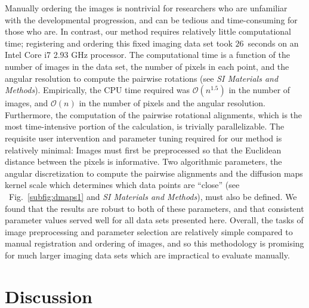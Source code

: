 \documentclass[twocolumn, 10pt]{article}
\newcommand{\SI}[0]{\textit{SI Materials and Methods}}
\newcommand{\fig}[0]{Fig.}
\begin{document}
Manually ordering the images is nontrivial for researchers who are unfamiliar with the developmental progression, and can be tedious and time-consuming for those who are.
%
In contrast, our method requires relatively little computational time; registering and ordering this fixed imaging data set took $26$~seconds on an Intel Core i7 2.93 GHz processor. %
%
The computational time is a function of the number of images in the data set, the number of pixels in each point, and the angular resolution to compute the pairwise rotations (see \SI). 
%
Empirically, the CPU time required was $\mathcal{O}(n^{1.5})$ in the number of images, and $\mathcal{O}(n)$ in the number of pixels and the angular resolution.
%
Furthermore, the computation of the pairwise rotational alignments, which is the most time-intensive portion of the calculation, is trivially parallelizable.
%
The requisite user intervention and parameter tuning required for our method is relatively minimal: Images must first be preprocessed so that the Euclidean distance between the pixels is informative.
%
Two algorithmic parameters, the angular discretization to compute the pairwise alignments and the diffusion maps kernel scale which determines which data points are ``close'' (see ~\fig~\ref{subfig:dmaps1} and \SI), must also be defined.
%
We found that the results are robust to both of these parameters, and that consistent parameter values served well for all data sets presented here. 
%
%
Overall, the tasks of image preprocessing and parameter selection are relatively simple compared to manual registration and ordering of images, and so this methodology is promising for much larger imaging data sets which are impractical to evaluate manually. 


\section*{Discussion}
\end{document}
